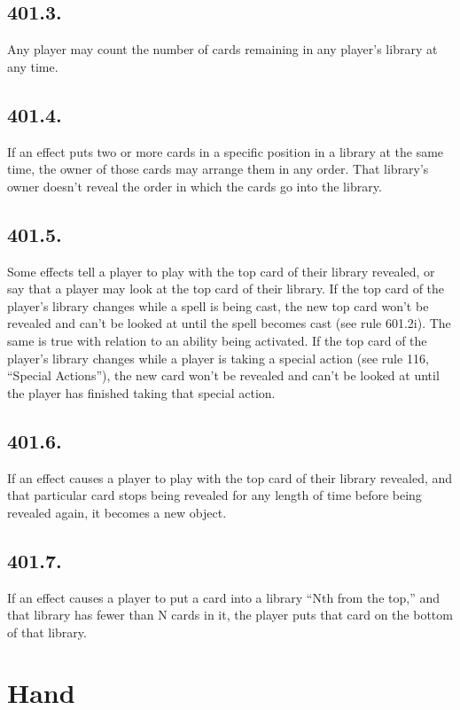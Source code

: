 \subsection*{401.3.}
Any player may count the number of cards remaining in any player’s library at any time.

\subsection*{401.4.}
If an effect puts two or more cards in a specific position in a library at the same time, the owner of those cards may arrange them in any order. That library’s owner doesn’t reveal the order in which the cards go into the library.

\subsection*{401.5.}
Some effects tell a player to play with the top card of their library revealed, or say that a player may look at the top card of their library. If the top card of the player’s library changes while a spell is being cast, the new top card won’t be revealed and can’t be looked at until the spell becomes cast (see rule 601.2i). The same is true with relation to an ability being activated. If the top card of the player’s library changes while a player is taking a special action (see rule 116, “Special Actions”), the new card won’t be revealed and can’t be looked at until the player has finished taking that special action.

\subsection*{401.6.}
If an effect causes a player to play with the top card of their library revealed, and that particular card stops being revealed for any length of time before being revealed again, it becomes a new object.

\subsection*{401.7.}
If an effect causes a player to put a card into a library “Nth from the top,” and that library has fewer than N cards in it, the player puts that card on the bottom of that library.

\section{Hand}

